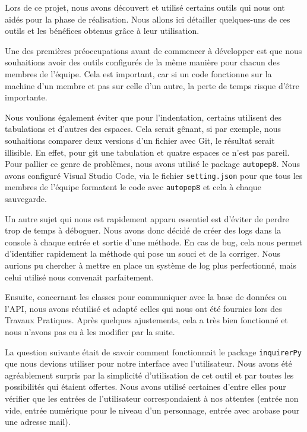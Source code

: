 \documentclass[11pt]{article}
\begin{document}
Lors de ce projet, nous avons découvert et utilisé certains outils qui nous ont aidés pour la phase de réalisation. Nous allons ici détailler quelques-uns de ces outils et les bénéfices obtenus grâce à leur utilisation.

\bigbreak

Une des premières préoccupations avant de commencer à développer est que nous souhaitions avoir des outils configurés de la même manière pour chacun des membres de l'équipe. Cela est important, car si un code fonctionne sur la machine d'un membre et pas sur celle d'un autre, la perte de temps risque d'être importante.


\bigbreak

Nous voulions également éviter que pour l'indentation, certains utilisent des tabulations et d'autres des espaces. Cela serait gênant, si par exemple, nous souhaitions comparer deux versions d'un fichier avec Git, le résultat serait illisible. En effet, pour git une tabulation et quatre espaces ce n'est pas pareil. Pour pallier ce genre de problèmes, nous avons utilisé le package \texttt{autopep8}. Nous avons configuré Visual Studio Code, via le fichier \texttt{setting.json} pour que tous les membres de l'équipe formatent le code avec \texttt{autopep8} et cela à chaque sauvegarde.

\bigbreak

Un autre sujet qui nous est rapidement apparu essentiel est d'éviter de perdre trop de temps à déboguer. Nous avons donc décidé de créer des logs dans la console à chaque entrée et sortie d'une méthode. En cas de bug, cela nous permet d'identifier rapidement la méthode qui pose un souci et de la corriger. Nous aurions pu chercher à mettre en place un système de log plus perfectionné, mais celui utilisé nous convenait parfaitement.

\bigbreak

Ensuite, concernant les classes pour communiquer avec la base de données ou l'API, nous avons réutilisé et adapté celles qui nous ont été fournies lors des Travaux Pratiques. Après quelques ajustements, cela a très bien fonctionné et nous n'avons pas eu à les modifier par la suite.

\bigbreak

La question suivante était de savoir comment fonctionnait le package \texttt{inquirerPy} que nous devions utiliser pour notre interface avec l'utilisateur. Nous avons été agréablement surpris par la simplicité d'utilisation de cet outil et par toutes les possibilités qui étaient offertes. Nous avons utilisé certaines d'entre elles pour vérifier que les entrées de l'utilisateur correspondaient à nos attentes (entrée non vide, entrée numérique pour le niveau d'un personnage, entrée avec arobase pour une adresse mail).
\end{document}
